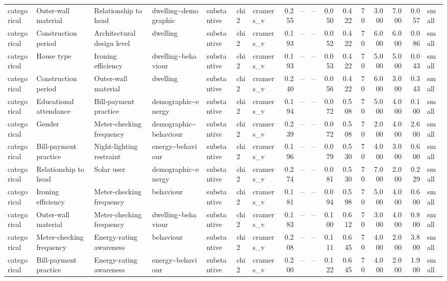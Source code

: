 \begin{table}
\begin{tabular}{lllllllrrrrrrrrrl}
categorical & Outer-wall material & Relationship to head & dwelling\textasciitilde demographic & substantive & chi2 & cramers\_v & 0.255 & -- & -- & 0.050 & 0.422 & 70 & 3.000 & 7.000 & 0.057 & small \\
categorical & Construction period & Architectural design level & dwelling & substantive & chi2 & cramers\_v & 0.193 & -- & -- & 0.052 & 0.422 & 70 & 6.000 & 6.000 & 0.086 & small \\
categorical & House type & Ironing efficiency & dwelling\textasciitilde behaviour & substantive & chi2 & cramers\_v & 0.193 & -- & -- & 0.053 & 0.422 & 70 & 5.000 & 5.000 & 0.043 & small \\
categorical & Construction period & Outer-wall material & dwelling & substantive & chi2 & cramers\_v & 0.240 & -- & -- & 0.056 & 0.422 & 70 & 6.000 & 3.000 & 0.343 & small \\
categorical & Educational attendance & Bill-payment practice & demographic\textasciitilde energy & substantive & chi2 & cramers\_v & 0.194 & -- & -- & 0.072 & 0.508 & 70 & 5.000 & 4.000 & 0.100 & small \\
categorical & Gender & Meter-checking frequency & demographic\textasciitilde behaviour & substantive & chi2 & cramers\_v & 0.239 & -- & -- & 0.072 & 0.508 & 70 & 2.000 & 4.000 & 2.600 & small \\
categorical & Bill-payment practice & Night-lighting restraint & energy\textasciitilde behaviour & substantive & chi2 & cramers\_v & 0.196 & -- & -- & 0.079 & 0.530 & 70 & 4.000 & 3.000 & 0.600 & small \\
categorical & Relationship to head & Solar user & demographic\textasciitilde energy & substantive & chi2 & cramers\_v & 0.274 & -- & -- & 0.081 & 0.530 & 70 & 7.000 & 2.000 & 0.229 & small \\
categorical & Ironing efficiency & Meter-checking frequency & behaviour & substantive & chi2 & cramers\_v & 0.181 & -- & -- & 0.094 & 0.598 & 70 & 5.000 & 4.000 & 0.600 & small \\
categorical & Outer-wall material & Meter-checking frequency & dwelling\textasciitilde behaviour & substantive & chi2 & cramers\_v & 0.183 & -- & -- & 0.100 & 0.612 & 70 & 3.000 & 4.000 & 0.800 & small \\
categorical & Meter-checking frequency & Energy-rating awareness & behaviour & substantive & chi2 & cramers\_v & 0.208 & -- & -- & 0.111 & 0.645 & 70 & 4.000 & 2.000 & 3.800 & small \\
categorical & Bill-payment practice & Energy-rating awareness & energy\textasciitilde behaviour & substantive & chi2 & cramers\_v & 0.200 & -- & -- & 0.122 & 0.645 & 70 & 4.000 & 2.000 & 1.900 & small \\

\end{tabular}
\end{table}
